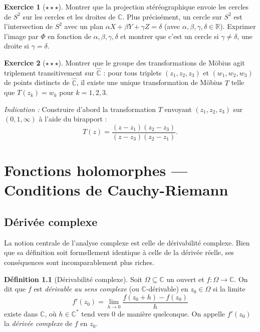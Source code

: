 \documentclass[12pt,a4paper,openany]{book}
\theoremstyle{definition}
\newtheorem{definition}{Définition}[chapter]
\newtheorem{exercice}{Exercice}[chapter]
\theoremstyle{plain}
\theoremstyle{remark}
\newcommand{\C}{\mathbb{C}}
\newcommand{\R}{\mathbb{R}}
\begin{document}
\begin{exercice}[$\star\star\star$]\label{exo:stereo-cercles}
Montrer que la projection stéréographique envoie les cercles de $S^2$ sur les cercles et les droites de $\C$. Plus précisément, un cercle sur $S^2$ est l'intersection de $S^2$ avec un plan $\alpha X + \beta Y + \gamma Z = \delta$ (avec $\alpha, \beta, \gamma, \delta \in \R$). Exprimer l'image par $\Phi$ en fonction de $\alpha, \beta, \gamma, \delta$ et montrer que c'est un cercle si $\gamma \neq \delta$, une droite si $\gamma = \delta$.
\end{exercice}

\begin{exercice}[$\star\star\star$]\label{exo:mobius-triple-transitivite}
Montrer que le groupe des transformations de Möbius agit triplement transitivement sur $\hat{\C}$ : pour tous triplets $(z_1, z_2, z_3)$ et $(w_1, w_2, w_3)$ de points distincts de $\hat{\C}$, il existe une unique transformation de Möbius $T$ telle que $T(z_k) = w_k$ pour $k = 1,2,3$.

\emph{Indication :} Construire d'abord la transformation $T$ envoyant $(z_1, z_2, z_3)$ sur $(0, 1, \infty)$ à l'aide du birapport :
\[
  T(z) = \frac{(z - z_1)(z_2 - z_3)}{(z - z_3)(z_2 - z_1)}.
\]
\end{exercice}

\chapter{Fonctions holomorphes --- Conditions de Cauchy-Riemann}\label{ch:holomorphes}

\section{Dérivée complexe}\label{sec:derivee-complexe}

La notion centrale de l'analyse complexe est celle de dérivabilité complexe. Bien que sa définition soit formellement identique à celle de la dérivée réelle, ses conséquences sont incomparablement plus riches.

\begin{definition}[Dérivabilité complexe]\label{def:derivee-complexe}
Soit $\Omega \subseteq \C$ un ouvert et $f : \Omega \to \C$. On dit que $f$ est \emph{dérivable au sens complexe} (ou $\C$-dérivable) en $z_0 \in \Omega$ si la limite
\[
  f'(z_0) = \lim_{h \to 0} \frac{f(z_0 + h) - f(z_0)}{h}
\]
existe dans $\C$, où $h \in \C^*$ tend vers $0$ de manière quelconque. On appelle $f'(z_0)$ la \emph{dérivée complexe} de $f$ en $z_0$.
\end{definition}
\end{document}
